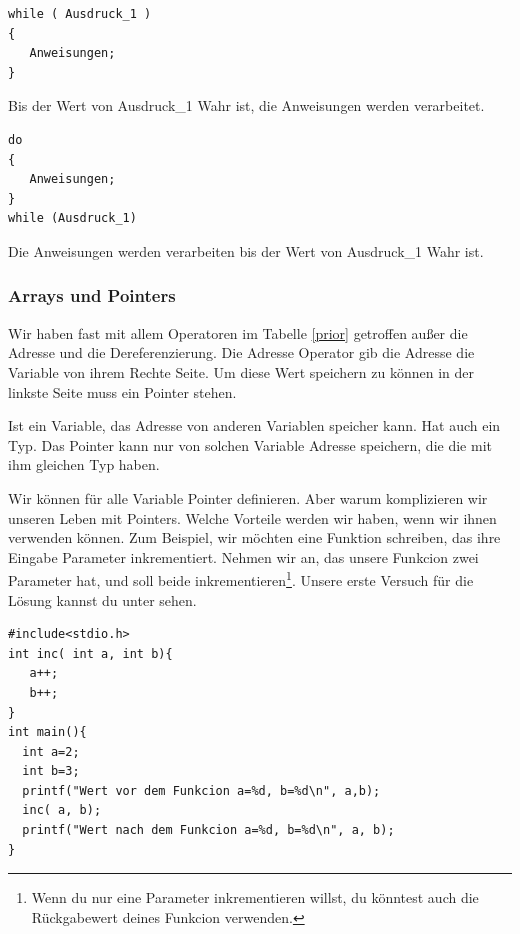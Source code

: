 \documentclass{article}[12pt]
\newenvironment{myalertblock}[1]{%
    \tcolorbox[beamer,%
    noparskip,breakable,
    colback=White,colframe=Bittersweet,%
    colbacklower=Peach!75!White,%
    title=#1]}%
    {\endtcolorbox}
\newenvironment{myblock}[1]{%
    \tcolorbox[beamer,%
    noparskip,breakable,
    colback=White,colframe=RoyalBlue,%
    colbacklower=TealBlue!75!White,%
    title=#1]}%
    {\endtcolorbox}
\begin{document}
\begin{myalertblock}{While Kontrollstrukture}
\begin{lstlisting}
while ( Ausdruck_1 )
{
   Anweisungen;
}
\end{lstlisting}
\vspace{-0.5cm}
Bis der Wert von Ausdruck\_1 Wahr ist, die Anweisungen werden verarbeitet.
\end{myalertblock}

\begin{myalertblock}{Do While Kontrollstrukture}
\begin{lstlisting}
do
{
   Anweisungen;
}
while (Ausdruck_1)
\end{lstlisting}
\vspace{-0.5cm}
Die Anweisungen werden verarbeiten bis der Wert von Ausdruck\_1 Wahr ist.
\end{myalertblock}

\subsubsection{Arrays und Pointers}

Wir haben fast mit allem Operatoren im Tabelle \ref{prior} getroffen außer die Adresse und die Dereferenzierung.
Die Adresse Operator gib die Adresse die Variable von ihrem Rechte Seite. Um diese Wert speichern zu können in 
der linkste Seite muss ein Pointer stehen.  

\begin{myblock}{Definition \texttt{Pointer}}
Ist ein Variable, das Adresse von anderen Variablen speicher kann. Hat auch ein Typ.
Das Pointer kann nur von solchen Variable Adresse speichern, die die mit ihm gleichen Typ haben.
\end{myblock}

Wir können für alle Variable Pointer definieren. Aber warum komplizieren wir unseren Leben mit Pointers.
Welche Vorteile werden wir haben, wenn wir ihnen verwenden können. Zum Beispiel, wir möchten 
eine Funktion schreiben, das ihre Eingabe Parameter inkrementiert. Nehmen wir an, das unsere
Funkcion zwei Parameter hat, und soll beide inkrementieren\footnote{Wenn du nur eine Parameter
inkrementieren willst, du könntest auch die Rückgabewert deines Funkcion verwenden.}.
Unsere erste Versuch für die Lösung kannst du unter sehen.

\begin{lstlisting}
#include<stdio.h>
int inc( int a, int b){
   a++;
   b++;
}
int main(){
  int a=2;
  int b=3;
  printf("Wert vor dem Funkcion a=%d, b=%d\n", a,b);
  inc( a, b);
  printf("Wert nach dem Funkcion a=%d, b=%d\n", a, b); 
}
\end{lstlisting}
\end{document}
